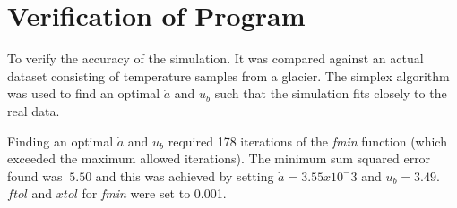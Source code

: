 \documentclass{article}%
\begin{document}
    \section{Verification of Program}
    To verify the accuracy of the simulation. 
    It was compared against an actual dataset consisting of temperature samples from a glacier. 
    The simplex algorithm was used to find an optimal $\dot{a}$ and $u_b$ such that the simulation fits closely to the real data. 

    Finding an optimal $\dot{a}$ and $u_b$ required 178 iterations of the {\it fmin} function (which exceeded the maximum allowed iterations). The minimum sum squared error found was $~5.50$ and this was achieved by setting $\dot{a} = 3.55x10^-3$ and $u_b = 3.49$. $ftol$ and $xtol$ for {\it fmin} were set to 0.001.

\end{document}

